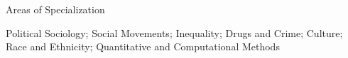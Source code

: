 \begin{rSection}{Areas of Specialization}

Political Sociology; Social Movements; Inequality; Drugs and Crime; Culture; Race and Ethnicity; Quantitative and Computational Methods%
\end{rSection}




